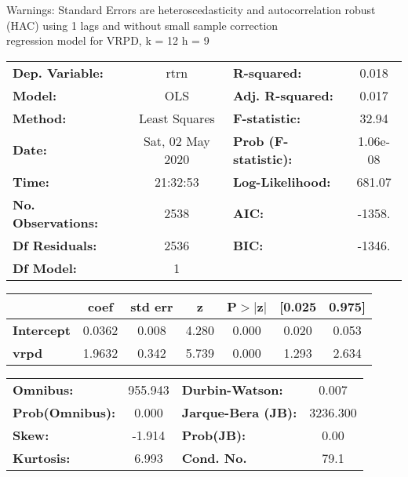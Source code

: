 Warnings: \newline
 [1] Standard Errors are heteroscedasticity and autocorrelation robust (HAC) using 1 lags and without small sample correction\\ 

regression model for VRPD, k = 12 h = 9\begin{center}
\begin{tabular}{lclc}
\toprule
\textbf{Dep. Variable:}    &       rtrn       & \textbf{  R-squared:         } &     0.018   \\
\textbf{Model:}            &       OLS        & \textbf{  Adj. R-squared:    } &     0.017   \\
\textbf{Method:}           &  Least Squares   & \textbf{  F-statistic:       } &     32.94   \\
\textbf{Date:}             & Sat, 02 May 2020 & \textbf{  Prob (F-statistic):} &  1.06e-08   \\
\textbf{Time:}             &     21:32:53     & \textbf{  Log-Likelihood:    } &    681.07   \\
\textbf{No. Observations:} &        2538      & \textbf{  AIC:               } &    -1358.   \\
\textbf{Df Residuals:}     &        2536      & \textbf{  BIC:               } &    -1346.   \\
\textbf{Df Model:}         &           1      & \textbf{                     } &             \\
\bottomrule
\end{tabular}
\begin{tabular}{lcccccc}
                   & \textbf{coef} & \textbf{std err} & \textbf{z} & \textbf{P$> |$z$|$} & \textbf{[0.025} & \textbf{0.975]}  \\
\midrule
\textbf{Intercept} &       0.0362  &        0.008     &     4.280  &         0.000        &        0.020    &        0.053     \\
\textbf{vrpd}      &       1.9632  &        0.342     &     5.739  &         0.000        &        1.293    &        2.634     \\
\bottomrule
\end{tabular}
\begin{tabular}{lclc}
\textbf{Omnibus:}       & 955.943 & \textbf{  Durbin-Watson:     } &    0.007  \\
\textbf{Prob(Omnibus):} &   0.000 & \textbf{  Jarque-Bera (JB):  } & 3236.300  \\
\textbf{Skew:}          &  -1.914 & \textbf{  Prob(JB):          } &     0.00  \\
\textbf{Kurtosis:}      &   6.993 & \textbf{  Cond. No.          } &     79.1  \\
\bottomrule
\end{tabular}
\end{center}

